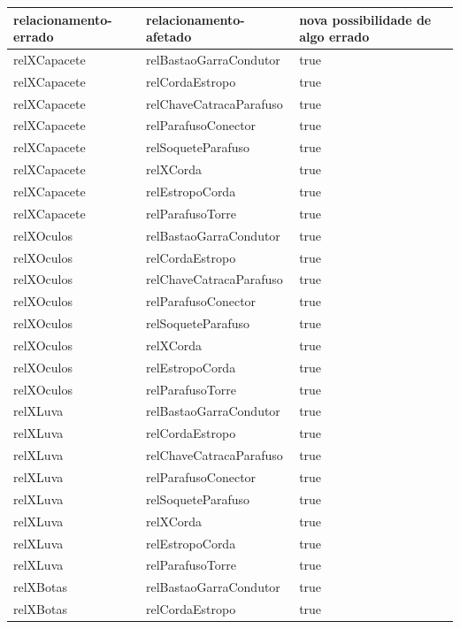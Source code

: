 \documentclass[12pt]{article}
\begin{document}
\begin{table}[H]
\centering
{}
\begin{tabular}{|l|l|l|}
\hline
\textbf{relacionamento-errado} & \textbf{relacionamento-afetado} & \textbf{nova possibilidade de algo errado} \\ \hline
relXCapacete & relBastaoGarraCondutor & true \\ \hline
relXCapacete & relCordaEstropo & true \\ \hline
relXCapacete & relChaveCatracaParafuso & true \\ \hline
relXCapacete & relParafusoConector & true \\ \hline
relXCapacete & relSoqueteParafuso & true \\ \hline
relXCapacete & relXCorda & true \\ \hline
relXCapacete & relEstropoCorda & true \\ \hline
relXCapacete & relParafusoTorre & true \\ \hline
relXOculos & relBastaoGarraCondutor & true \\ \hline
relXOculos & relCordaEstropo & true \\ \hline
relXOculos & relChaveCatracaParafuso & true \\ \hline
relXOculos & relParafusoConector & true \\ \hline
relXOculos & relSoqueteParafuso & true \\ \hline
relXOculos & relXCorda & true \\ \hline
relXOculos & relEstropoCorda & true \\ \hline
relXOculos & relParafusoTorre & true \\ \hline
relXLuva & relBastaoGarraCondutor & true \\ \hline
relXLuva & relCordaEstropo & true \\ \hline
relXLuva & relChaveCatracaParafuso & true \\ \hline
relXLuva & relParafusoConector & true \\ \hline
relXLuva & relSoqueteParafuso & true \\ \hline
relXLuva & relXCorda & true \\ \hline
relXLuva & relEstropoCorda & true \\ \hline
relXLuva & relParafusoTorre & true \\ \hline
relXBotas & relBastaoGarraCondutor & true \\ \hline
relXBotas & relCordaEstropo & true \\ \hline

\end{tabular}
\end{table}
\end{document}
